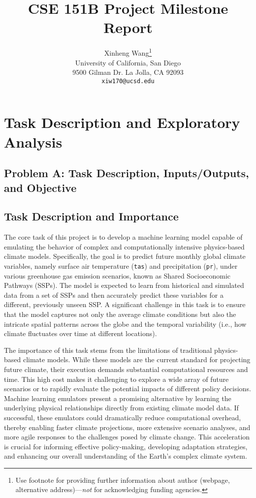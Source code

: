 \documentclass{article}
\title{CSE 151B Project Milestone Report}
\author{%
  Xinheng Wang\thanks{Use footnote for providing further information
    about author (webpage, alternative address)---\emph{not} for acknowledging
    funding agencies.} \\
    University of California, San Diego\\
  9500 Gilman Dr. La Jolla, CA 92093\\
  \texttt{xiw170@ucsd.edu} \\
}
\begin{document}
\maketitle


\section{Task Description and Exploratory Analysis}

\subsection{Problem A: Task Description, Inputs/Outputs, and Objective}

\subsection{Task Description and Importance}

The core task of this project is to develop a machine learning model capable of emulating the behavior of complex and computationally intensive physics-based climate models. Specifically, the goal is to predict future monthly global climate variables, namely surface air temperature (\texttt{tas}) and precipitation (\texttt{pr}), under various greenhouse gas emission scenarios, known as Shared Socioeconomic Pathways (SSPs). The model is expected to learn from historical and simulated data from a set of SSPs and then accurately predict these variables for a different, previously unseen SSP. A significant challenge in this task is to ensure that the model captures not only the average climate conditions but also the intricate spatial patterns across the globe and the temporal variability (i.e., how climate fluctuates over time at different locations).

The importance of this task stems from the limitations of traditional physics-based climate models. While these models are the current standard for projecting future climate, their execution demands substantial computational resources and time. This high cost makes it challenging to explore a wide array of future scenarios or to rapidly evaluate the potential impacts of different policy decisions. Machine learning emulators present a promising alternative by learning the underlying physical relationships directly from existing climate model data. If successful, these emulators could dramatically reduce computational overhead, thereby enabling faster climate projections, more extensive scenario analyses, and more agile responses to the challenges posed by climate change. This acceleration is crucial for informing effective policy-making, developing adaptation strategies, and enhancing our overall understanding of the Earth's complex climate system.
\end{document}
